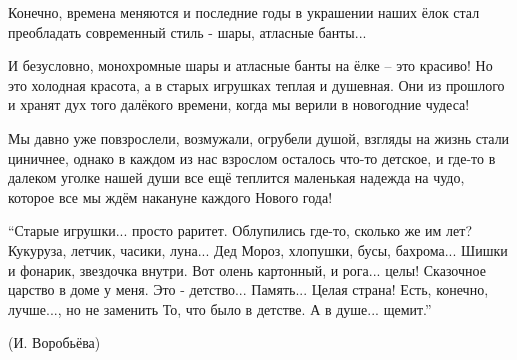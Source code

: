 Конечно, времена меняются и  последние годы в украшении наших ёлок стал
преобладать современный стиль - шары, атласные банты...

И безусловно, монохромные шары и атласные банты на ёлке – это красиво! Но это
холодная красота, а в старых игрушках теплая и душевная. Они из прошлого и
хранят дух того далёкого времени, когда мы верили в новогодние чудеса!

Мы давно уже повзрослели, возмужали, огрубели душой, взгляды на жизнь стали
циничнее, однако в каждом из нас взрослом осталось что-то детское, и  где-то в
далеком уголке нашей души все ещё теплится маленькая надежда на чудо, которое
все мы ждём накануне каждого Нового года!

\begin{zznagolos}
\obeycr
\enquote{Старые игрушки... просто раритет.
Облупились где-то, сколько же им лет?
Кукуруза, летчик, часики, луна...
Дед Мороз, хлопушки, бусы, бахрома...
Шишки и фонарик, звездочка внутри.
Вот олень картонный, и рога... целы!
Сказочное царство в доме у меня.
Это - детство... Память... Целая страна!
Есть, конечно, лучше..., но не заменить
То, что было в детстве. А в душе... щемит.}
\restorecr
\end{zznagolos}

(И. Воробьёва)
